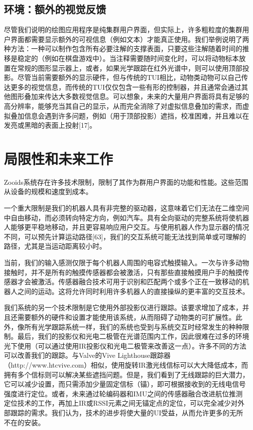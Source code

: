 \subsection{环境：额外的视觉反馈}

尽管我们说明的绘图应用程序是纯集群用户界面，但实际上，许多粗粒度的集群用户界面都需要显示额外的可视信息（例如文本）才能真正使用。我们举例说明了两种方法：一种可以制作包含所有必要注解的支撑表面，只要这些注解随着时间的推移是稳定的（例如在棋盘游戏中）。当注释需要随时间变化时，可以将动物标本放置在常规的图形显示器上，或者，如果光学跟踪在红外光谱中，则可以使用顶部投影。尽管当前需要额外的显示硬件，但与传统的TUI相比，动物类动物可以自己传达更多的视觉信息，而传统的TUI仅仅包含一些有形的控制器，并且通常会通过其他图形叠加来传达大多数视觉信息。可以想象，未来的大量用户界面将具有足够的高分辨率，能够充当其自己的显示，从而完全消除了对虚拟信息叠加的需求，而虚拟叠加信息会遇到许多问题，例如（用于顶部投影）遮挡，校准困难，并且难以在发亮或黑暗的表面上投射[17]。

\section{局限性和未来工作}

Zooids系统存在许多技术限制，限制了其作为群用户界面的功能和性能。这些范围从设备的规模和速度到成本。

一个重大限制是我们的机器人具有非完整的驱动器，这意味着它们无法在二维空间中自由移动，而必须转向特定方向，例如汽车。具有全向驱动的完整系统将使机器人能够更平稳地移动，并且更容易响应用户交互。与使用机器人作为显示器的情况不同，可以预先计算运动路径[63]，我们的交互系统可能无法找到简单或可理解的路径，尤其是当运动距离较小时。

当前，我们的输入感测仅限于每个机器人周围的电容式触摸输入。一次与许多动物接触时，并不是所有的触摸传感器都会被激活，只有那些直接触摸用户手的触摸传感器才会被激活。传感器融合技术可用于识别和匹配两个或多个正在一致移动的机器人之间的运动。这将允许同时利用许多机器人的直接操纵的更丰富的交互技术。

我们系统的另一个技术限制是它使用外部投影仪进行跟踪。该要求增加了成本，并且还需要额外的硬件和设置才能使用该系统，从而阻碍了动物类的可扩展性。此外，像所有光学跟踪系统一样，我们的系统也受到与系统交互时经常发生的种种限制。最后，我们的投影仪和光电二极管在光谱范围内工作，因此很难在过多的环境光下使用（可以通过使用IR投影仪和光电二极管来改善这一点）。许多不同的方法可以改善我们的跟踪。与Valve的Vive Lighthouse跟踪器（http://www.htcvive.com）相似，使用旋转IR激光线信标可以大大降低成本，而拥有多个信标则可以解决某些遮挡问题。但是，我们看到了无线跟踪的巨大潜力，它可以减少设置，而只需添加少量固定信标（锚），即可根据接收到的无线电信号强度进行定位。或者，未来通过轮编码器和IMU之间的传感器融合改进航位推测定位技术的工作，再加上IR或RSSI元素之间无锚定点的定位，可以完全减少对外部跟踪的需求。我们认为，技术的进步将使大量的UI受益，从而允许更多的无所不在的安装。

